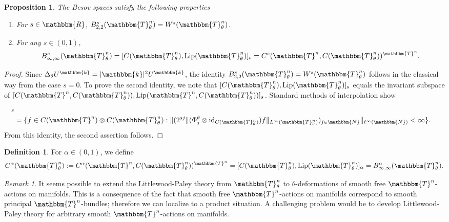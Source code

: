 \documentclass[10pt]{amsart}
\newtheorem{prop}[thm]{Proposition}
\theoremstyle{remark}
\newtheorem{remark}[thm]{Remark}
\theoremstyle{definition}
\newtheorem{deef}[thm]{Definition}
\begin{document}
\begin{prop}
\label{besovspacecomp}
The Besov spaces satisfy the following properties
\begin{enumerate}
\item For $s\in {\mathbbm{R}}$, $B^s_{2,2}({\mathbbm{T}}^n_\theta)=W^{s}({\mathbbm{T}}^n_\theta)$.
\item For any $s\in (0,1)$, 
$$B^s_{\infty,\infty}({\mathbbm{T}}^n_\theta)=[C({\mathbbm{T}}^n_\theta),{\textnormal{Lip}}({\mathbbm{T}}^n_\theta)]_{s}=C^s({\mathbbm{T}}^n,C({\mathbbm{T}}^n_\theta))^{{\mathbbm{T}}^n}.$$
\end{enumerate}
\end{prop}

\begin{proof}
Since $\Delta_\theta U^{\mathbbm{k}}=|\mathbbm{k}|^2U^{\mathbbm{k}}$, the identity $B^s_{2,2}({\mathbbm{T}}^n_\theta)=W^{s}({\mathbbm{T}}^n_\theta)$ follows in the classical way from the case $s=0$. To prove the second identity, we note that $[C({\mathbbm{T}}^n_\theta),{\textnormal{Lip}}({\mathbbm{T}}^n_\theta)]_{s}$ equals the invariant subspace of $[C({\mathbbm{T}}^n,C({\mathbbm{T}}^n_\theta)),{\textnormal{Lip}}({\mathbbm{T}}^n,C({\mathbbm{T}}^n_\theta))]_{s}$. Standard methods of interpolation show 
\begin{align*}
[C({\mathbbm{T}}^n,&C({\mathbbm{T}}^n_\theta)),{\textnormal{Lip}}({\mathbbm{T}}^n,C({\mathbbm{T}}^n_\theta))]_{s}\\
&=\{f\in C({\mathbbm{T}}^n)\otimes C({\mathbbm{T}}^n_\theta): \|(2^{sj}\|(\Phi_j^\theta\otimes { \mathrm{id}}_{C({\mathbbm{T}}^n_\theta)}) f\|_{L^\infty({\mathbbm{T}}^n_\theta)})_{j\in {\mathbbm{N}}}\|_{\ell^\infty({\mathbbm{N}})} <\infty\}.
\end{align*}
From this identity, the second assertion follows.
\end{proof}

\begin{deef}
For $\alpha\in (0,1)$, we define 
$$C^\alpha({\mathbbm{T}}^n_\theta):=C^\alpha({\mathbbm{T}}^n,C({\mathbbm{T}}^n_\theta))^{{\mathbbm{T}}^n}=[C({\mathbbm{T}}^n_\theta),{\textnormal{Lip}}({\mathbbm{T}}^n_\theta)]_{\alpha}=B^\alpha_{\infty,\infty}({\mathbbm{T}}^n_\theta).$$ 
\end{deef}

\begin{remark}
It seems possible to extend the Littlewood-Paley theory from ${\mathbbm{T}}^n_\theta$ to $\theta$-deformations of smooth free ${\mathbbm{T}}^n$-actions on manifolds. This is a consequence of the fact that smooth free ${\mathbbm{T}}^n$-actions on manifolds correspond to smooth principal ${\mathbbm{T}}^n$-bundles; therefore we can localize to a product situation. A challenging problem would be to develop Littlewood-Paley theory for arbitrary smooth ${\mathbbm{T}}^n$-actions on manifolds.
\end{remark}
\end{document}

